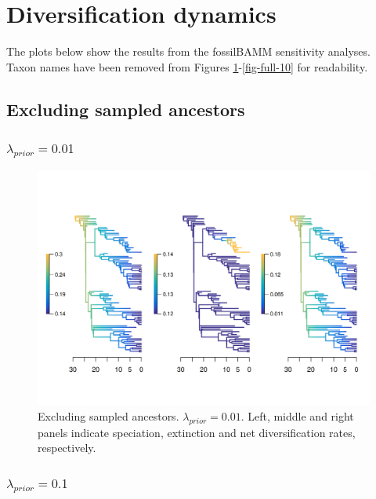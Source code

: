 \documentclass[a4paper, 12pt]{article}
\begin{document}
\newpage
\section{Diversification dynamics}

The plots below show the results from the fossilBAMM sensitivity analyses. 
Taxon names have been removed from Figures \ref{fig-noanc-0-01}-\ref{fig-full-10} for readability.

\subsection{Excluding sampled ancestors}

\subsubsection{$\lambda_{prior} = 0.01$}

\begin{figure}[H]
  \centering
  \includegraphics[width = \linewidth]{figures/diversification/sensitivity-analyses/shifts-0-01/sensitivity-analysis-noanc-0-01.png}
  \caption{Excluding sampled ancestors. $\lambda_{prior} = 0.01$. Left, middle and right panels indicate speciation, extinction and net diversification rates, respectively.}
  \label{fig-noanc-0-01}
\end{figure}

\subsubsection{$\lambda_{prior} = 0.1$}
\end{document}

